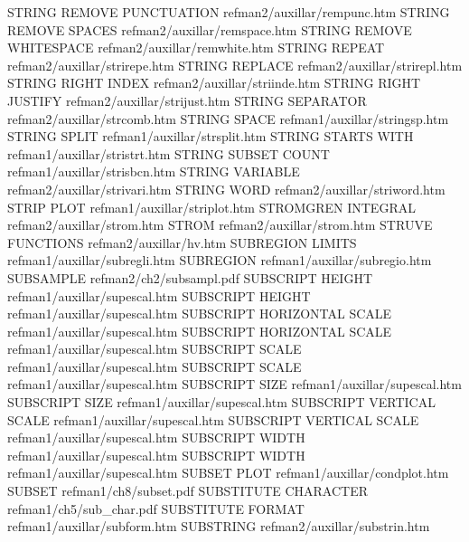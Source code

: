STRING REMOVE PUNCTUATION               refman2/auxillar/rempunc.htm
STRING REMOVE SPACES                    refman2/auxillar/remspace.htm
STRING REMOVE WHITESPACE                refman2/auxillar/remwhite.htm
STRING REPEAT                           refman2/auxillar/strirepe.htm
STRING REPLACE                          refman2/auxillar/strirepl.htm
STRING RIGHT INDEX                      refman2/auxillar/striinde.htm
STRING RIGHT JUSTIFY                    refman2/auxillar/strijust.htm
STRING SEPARATOR                        refman2/auxillar/strcomb.htm
STRING SPACE                            refman1/auxillar/stringsp.htm
STRING SPLIT                            refman1/auxillar/strsplit.htm
STRING STARTS WITH                      refman1/auxillar/stristrt.htm
STRING SUBSET COUNT                     refman1/auxillar/strisbcn.htm
STRING VARIABLE                         refman2/auxillar/strivari.htm
STRING WORD                             refman2/auxillar/striword.htm
STRIP PLOT                              refman1/auxillar/striplot.htm
STROMGREN INTEGRAL                      refman2/auxillar/strom.htm
STROM                                   refman2/auxillar/strom.htm
STRUVE FUNCTIONS                        refman2/auxillar/hv.htm
SUBREGION LIMITS                        refman1/auxillar/subregli.htm
SUBREGION                               refman1/auxillar/subregio.htm
SUBSAMPLE                               refman2/ch2/subsampl.pdf
SUBSCRIPT HEIGHT                        refman1/auxillar/supescal.htm
SUBSCRIPT HEIGHT                        refman1/auxillar/supescal.htm
SUBSCRIPT HORIZONTAL SCALE              refman1/auxillar/supescal.htm
SUBSCRIPT HORIZONTAL SCALE              refman1/auxillar/supescal.htm
SUBSCRIPT SCALE                         refman1/auxillar/supescal.htm
SUBSCRIPT SCALE                         refman1/auxillar/supescal.htm
SUBSCRIPT SIZE                          refman1/auxillar/supescal.htm
SUBSCRIPT SIZE                          refman1/auxillar/supescal.htm
SUBSCRIPT VERTICAL SCALE                refman1/auxillar/supescal.htm
SUBSCRIPT VERTICAL SCALE                refman1/auxillar/supescal.htm
SUBSCRIPT WIDTH                         refman1/auxillar/supescal.htm
SUBSCRIPT WIDTH                         refman1/auxillar/supescal.htm
SUBSET PLOT                             refman1/auxillar/condplot.htm
SUBSET                                  refman1/ch8/subset.pdf
SUBSTITUTE CHARACTER                    refman1/ch5/sub_char.pdf
SUBSTITUTE FORMAT                       refman1/auxillar/subform.htm
SUBSTRING                               refman2/auxillar/substrin.htm
